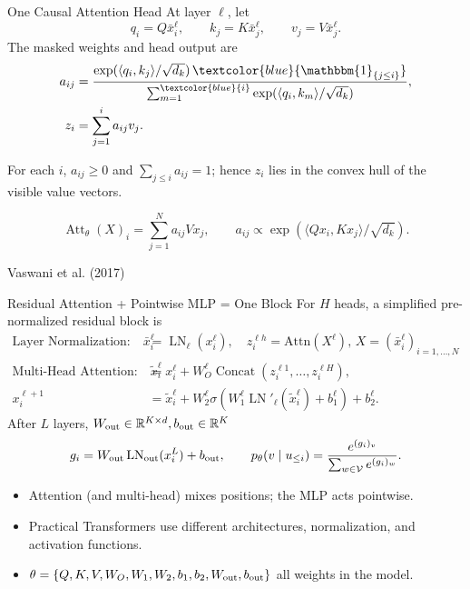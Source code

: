 \documentclass[aspectratio=169,11pt]{beamer}
\newcommand{\R}{\mathbb{R}}
\newcommand{\one}{\mathbbm{1}}
\newcommand{\onslidecite}[1]{\par\vspace{0.4ex}\hfill{\scriptsize\color{black!60}#1}}
\begin{document}
\begin{frame}{One Causal Attention Head}
At layer $\ell$, let
\[
 q_i=Q\bar x_i^\ell,\qquad k_j=K\bar x_j^\ell,
 \qquad v_j=V\bar x_j^\ell.
\]
The masked weights and head output are
\begin{align*}
 a_{ij}
 &=\frac{\exp(\langle q_i,k_j\rangle/\sqrt{d_k})\,
            \textcolor{blue}{\one_{\{j\le i\}}}}
          {\sum_{m=1}^{\textcolor{blue}{i}}\exp(\langle q_i,k_m\rangle/\sqrt{d_k})},\\
 z_i&=\sum_{j=1}^i a_{ij}v_j.
\end{align*}

For each $i$, $a_{ij}\ge0$ and $\sum_{j\le i}a_{ij}=1$; hence $z_i$ lies in
the convex hull of the visible value vectors.

$$ \operatorname{Att}_\theta(X)_i=\sum_{j=1}^N a_{ij}Vx_j,\qquad a_{ij}\propto \exp(\langle Qx_i,Kx_j\rangle/\sqrt{d_k}).$$   
\onslidecite{Vaswani et al. (2017)}
\end{frame}


\begin{frame}{Residual Attention + Pointwise MLP = One Block}
For $H$ heads, a simplified pre-normalized residual block is
\begin{align*}
\text{Layer Normalization:} \quad  \bar x_i^\ell
 &=\operatorname{LN}_\ell(x_i^\ell), \quad z_i^{\ell h}= \mathrm{Attn}(X^{\ell}),  \, X = ( \bar x_i^\ell)_{i=1,\ldots,N} \\
  \text{Multi-Head Attention:}    \quad  \widetilde x_i^\ell
 &=x_i^\ell+W_O^\ell
   \operatorname{Concat}(z_i^{\ell1},\ldots,z_i^{\ell H}),\\
  x_i^{\ell+1}
 &=\widetilde x_i^\ell+W_2^\ell
   \sigma\!\left(W_1^\ell
     \operatorname{LN}'_\ell(\widetilde x_i^\ell)+b_1^\ell\right)+b_2^\ell.
\end{align*}
\vspace{-3mm}
After $L$ layers, $W_{\rm out}\in \R^{K\times d}, b_{\rm out}\in \R^K$ \vspace{-3mm} 
\[
 g_i=W_{\rm out}\operatorname{LN}_{\rm out}(x_i^L)+b_{\rm out},
 \qquad
 p_{\theta}(v\mid u_{\le i})=\frac{e^{(g_i)_v}}
 {\sum_{w\in\mathcal V}e^{(g_i)_w}}.
\]
\vspace{-3mm}
\begin{itemize}
  \item Attention (and multi-head) mixes positions; the MLP acts pointwise.
  \item Practical Transformers use different architectures, normalization, and activation functions. 
  \item $\theta = \{Q, K, V, W_O, W_1, W_2, b_1, b_2, W_{\rm out}, b_{\rm out}\}$ all weights in the model.
\end{itemize}

\end{frame}
\end{document}

